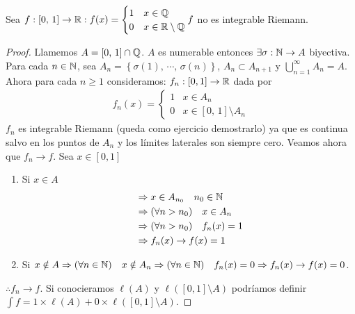 \begin{eg}
    Sea $f: [0 \text{, } 1] \to \mathbb{R} : f(x) = \begin{cases}
            1 & x \in \mathbb{Q}              \\
            0 & x \in \mathbb{R} \setminus \mathbb{Q}
        \end{cases} f$ no es integrable Riemann.
    \begin{proof}
        Llamemos $A = [0 \text{, } 1] \cap \mathbb{Q}$. $A$ es numerable entonces $\exists \sigma: \mathbb{N} \to A$ biyectiva. Para cada $n \in \mathbb{N}$, sea
        $A_n = \left\{ \sigma(1)\text{, } \cdots \text{, } \sigma(n) \right\}$, $A_n \subset A_{n+1}$ y $\bigcup_{n=1}^{\infty} A_n = A$.
        Ahora para cada $n \geq 1$ consideramos:
        $f_n: [0, 1] \to \mathbb{R}$ dada por
        \begin{align*}
            f_n(x) = \begin{cases}
                         1 & x \in A_n                          \\
                         0 & x \in [0\text{, } 1] \setminus A_n
                     \end{cases}
        \end{align*}
        $f_n$ es integrable Riemann (queda como ejercicio demostrarlo) ya que es continua salvo en los puntos de $A_n$ y
        los límites laterales son siempre cero.
        Veamos ahora que $f_n \to f$. Sea $x \in [0, 1]$ \begin{enumerate}
            \item Si $x \in A$ \begin{align*}
                       & \Rightarrow x \in A_{n_0} \quad n_0 \in \mathbb{N}     \\
                       & \Rightarrow (\forall n > n_0) \quad x \in A_n  \\
                       & \Rightarrow (\forall n > n_0) \quad f_n(x) = 1 \\
                       & \Rightarrow f_n(x) \to f(x) = 1
                  \end{align*}
            \item Si $x \notin A \Rightarrow (\forall n \in \mathbb{N}) \quad x \notin A_n \Rightarrow (\forall n \in \mathbb{N}) \quad f_n(x) = 0 \Rightarrow f_n(x) \to f(x) = 0$.
        \end{enumerate} $\therefore f_n \to f$.
        Si conocieramos $\ell(A)$ y $\ell([0, 1] \setminus A)$ podríamos definir $\int f = 1 \times \ell(A) + 0 \times \ell([0, 1] \setminus A)$.
    \end{proof}
\end{eg}

